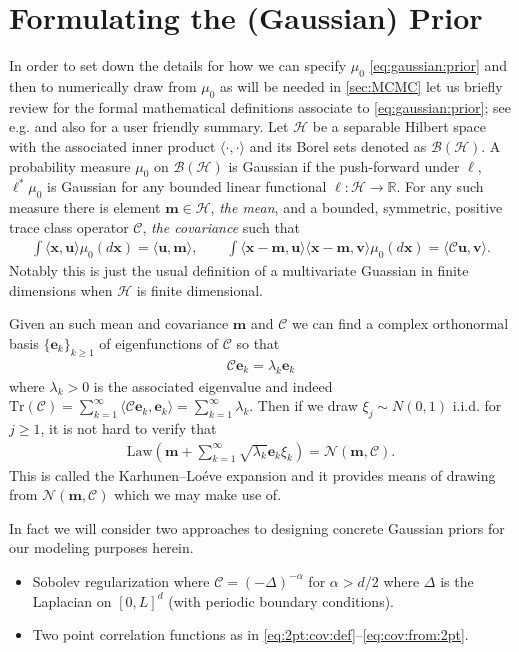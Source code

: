 \documentclass[18pt]{article}
\numberwithin{equation}{subsection}
\newcommand{\RR}{\mathbb{R}}
\newcommand{\cC}{\mathcal{C}}
\newcommand{\cH}{\mathcal{H}}
\newcommand{\la}{\langle}
\newcommand{\ra}{\rangle}
\newcommand{\bfx}{\mathbf{x}}
\newcommand{\bfm}{\mathbf{m}}
\newcommand{\bfu}{\mathbf{u}}
\newcommand{\bfv}{\mathbf{v}}
\newcommand{\bfe}{\mathbf{e}}
\begin{document}
\section{Formulating the (Gaussian) Prior}
\label{sec:prior}

In order to set down the details for how we can specify $\mu_0$ \eqref{eq:gaussian:prior} and then to numerically draw from $\mu_0$
as will be needed in \eqref{sec:MCMC} let us briefly review for the formal mathematical definitions associate to \eqref{eq:gaussian:prior};
see e.g. \cite{Hairer2009, DaPratoZabczyk2014} and also \cite[Appendix A.3]{DashtiStuart2017} for a user friendly summary.
Let $\cH$ be a separable Hilbert space with the associated inner product $\la \cdot, \cdot \ra$ and its Borel sets denoted as $\mathcal{B}(\cH)$.  A probability measure $\mu_0$ on $\mathcal{B}(\cH)$
is Gaussian if the push-forward under $\ell$,  $\ell^* \mu_0$ is Gaussian for any bounded linear functional $\ell: \cH \to \RR$.  For any such measure
there is element $\bfm \in \cH$, \emph{the mean}, and a bounded, symmetric, positive trace class operator $\cC$, \emph{the covariance} such that
\begin{align}
	\int \la \bfx, \bfu \ra \mu_0( d \bfx) =  \la \bfu, \bfm \ra, \qquad
	\int \la \bfx - \bfm, \bfu \ra \la \bfx - \bfm, \bfv \ra  \mu_0( d \bfx) = \la \cC \bfu, \bfv \ra.
\end{align}
Notably this is just the usual definition of a multivariate Guassian in finite dimensions when $\cH$ is finite dimensional.

Given an such mean and covariance $\bfm$ and $\cC$ we can find a complex orthonormal basis $\{\bfe_k\}_{k \geq 1}$ of
eigenfunctions of $\cC$ so that
\begin{align}
	\cC \bfe_k = \lambda_k  \bfe_k
\end{align}
where $\lambda_k > 0$ is the associated eigenvalue and indeed 
$\mbox{Tr}(\cC) = \sum_{k =1}^\infty \la \cC \bfe_k, \bfe_k \ra =  \sum_{k =1}^\infty \lambda_k$.  Then if we draw
$\xi_j \sim N(0,1)$ i.i.d. for $j\geq 1$, it is not hard to verify that
\begin{align}
	\label{eq:KL:expansion}
	\mbox{Law}\left( \bfm + \sum_{k =1}^\infty \sqrt{\lambda_k} \bfe_k \xi_k\right) = \mathcal{N}(\bfm, \cC).
\end{align}
This is called the Karhunen–Lo\'eve expansion and it provides means of drawing from $\mathcal{N}(\bfm, \cC)$
which we may make use of.  

In fact we will consider two approaches to designing concrete Gaussian priors for our modeling purposes herein.
\begin{itemize}
\item[(i)] Sobolev regularization where $\cC = (- \Delta)^{-\alpha}$ for $\alpha > d/2$ where $\Delta$ is the Laplacian on $[0,L]^d$ (with periodic boundary conditions).
\item[(ii)] Two point correlation functions as in \eqref{eq:2pt:cov:def}--\eqref{eq:cov:from:2pt}.
\end{itemize}
\end{document}
